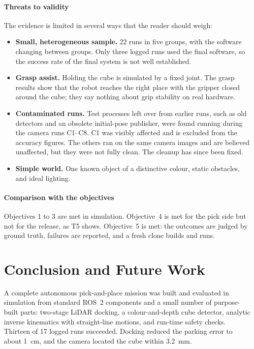 \documentclass[journal]{IEEEtran}
\begin{document}
\paragraph*{Threats to validity} The evidence is limited in several ways that the reader should weigh:
\begin{itemize}
  \item \textbf{Small, heterogeneous sample.} 22 runs in five groups, with the software changing between groups. Only three logged runs used the final software, so the success rate of the final system is not well established.
  \item \textbf{Grasp assist.} Holding the cube is simulated by a fixed joint. The grasp results show that the robot reaches the right place with the gripper closed around the cube; they say nothing about grip stability on real hardware.
  \item \textbf{Contaminated runs.} Test processes left over from earlier runs, such as old detectors and an obsolete initial-pose publisher, were found running during the camera runs C1--C8. C1 was visibly affected and is excluded from the accuracy figures. The others ran on the same camera images and are believed unaffected, but they were not fully clean. The cleanup has since been fixed.
  \item \textbf{Simple world.} One known object of a distinctive colour, static obstacles, and ideal lighting.
\end{itemize}

\paragraph*{Comparison with the objectives} Objectives 1 to 3 are met in simulation. Objective~4 is met for the pick side but not for the release, as T5 shows. Objective~5 is met: the outcomes are judged by ground truth, failures are reported, and a fresh clone builds and runs.

\section{Conclusion and Future Work}
\label{sec:future}
A complete autonomous pick-and-place mission was built and evaluated in simulation from standard ROS~2 components and a small number of purpose-built parts: two-stage LiDAR docking, a colour-and-depth cube detector, analytic inverse kinematics with straight-line motions, and run-time safety checks. Thirteen of 17 logged runs succeeded. Docking reduced the parking error to about \SI{1}{cm}, and the camera located the cube within \SI{3.2}{mm}.
\end{document}

